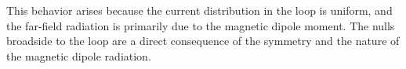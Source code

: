 This behavior arises because the current distribution in the loop is uniform, and the far-field radiation is primarily due to the magnetic dipole moment. The nulls broadside to the loop are a direct consequence of the symmetry and the nature of the magnetic dipole radiation.

